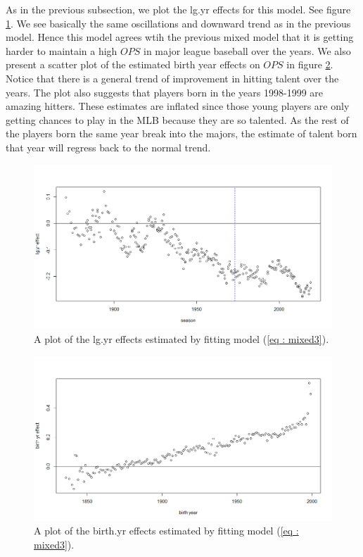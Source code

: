 \documentclass [52pt] {article}
\begin{document}
As in the previous subsection, we plot the lg.yr effects for this model.  See figure \ref{fig : lg.yr_effs_mixed3}.  We see basically the same oscillations and downward trend as in the previous model.  Hence this model agrees wtih the previous mixed model that it is getting harder to maintain a high $OPS$ in major league baseball over the years.  We also present a scatter plot of the estimated birth year effects on $OPS$ in figure \ref{fig : birth.yr_effs_mixed3}.  Notice that there is a general trend of improvement in hitting talent over the years.  The plot also suggests that players born in the years 1998-1999 are amazing hitters.  These estimates are inflated since those young players are only getting chances to play in the MLB because they are so talented.  As the rest of the players born the same year break into the majors, the estimate of talent born that year will regress back to the normal trend.
\begin{figure}[h!]
\centering
\includegraphics[scale = 0.5]{lg.yr_effs_mixed3.png}
\caption{\label{fig : lg.yr_effs_mixed3} A plot of the lg.yr effects estimated by fitting model (\ref{eq : mixed3}).}
\end{figure}
\begin{figure}[h!]
\centering
\includegraphics[scale = 0.5]{birth.yr_effs_mixed3.png}
\caption{\label{fig : birth.yr_effs_mixed3} A plot of the birth.yr effects estimated by fitting model (\ref{eq : mixed3}).}
\end{figure}
\end{document}
